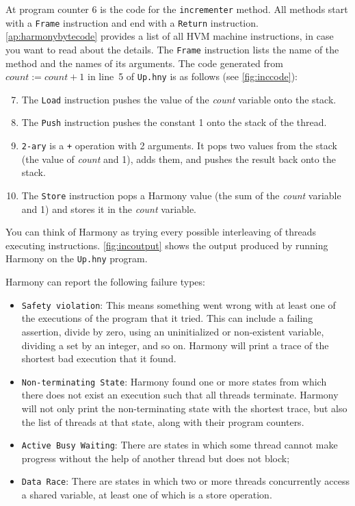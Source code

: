 \documentclass{report}
\begin{document}
At program counter 6 is the code for the \texttt{incrementer} method.
All methods start with a \texttt{Frame} instruction and end with a
\texttt{Return} instruction.
\autoref{ap:harmonybytecode} provides a list of all HVM machine instructions,
in case you want to read about the details.
The \texttt{Frame} instruction lists the name of the method and the
names of its arguments.
The code generated from $\mathit{count} := \mathit{count} + 1$ in line~5 of
\texttt{Up.hny} is as follows (see \autoref{fig:inccode}):

\begin{enumerate} \setcounter{enumi}{6}
\item The \texttt{Load} instruction pushes the value of the
\textit{count} variable onto the stack.
\item The \texttt{Push} instruction pushes the constant 1
onto the stack of the thread.
\item \texttt{2-ary} is a \texttt{+} operation with 2 arguments.
It pops two values from the stack (the value of \textit{count} and 1),
adds them, and pushes the result back onto the stack.
\item The \texttt{Store} instruction pops
a Harmony value (the sum of the \textit{count} variable and 1) and
stores it in the \textit{count} variable.
\end{enumerate}

You can think of Harmony as trying every possible interleaving of threads executing
instructions.
\autoref{fig:incoutput} shows the output produced by running Harmony on the
\texttt{Up.hny} program.

Harmony can report the following failure types:
\begin{itemize}
\item \texttt{Safety violation}: This means something went wrong with
at least one of the executions of the program that it tried.  This
can include a failing assertion, divide by zero, using an uninitialized
or non-existent variable, dividing a set by an integer, and so on.
Harmony will print a trace of the shortest bad execution that it found.
\item \texttt{Non-terminating State}: Harmony found one or more states
from which there does not exist an execution such that all threads
terminate.  Harmony will not only print the non-terminating state with
the shortest trace, but also the list of threads
at that state, along with their program counters.
\item \texttt{Active Busy Waiting}:  There are states in which
some thread cannot make progress without the help of another thread but
does not block;
\item \texttt{Data Race}: There are states in which two or more threads
concurrently access a shared variable, at least one of which is a store
operation.
\end{itemize}
\end{document}
